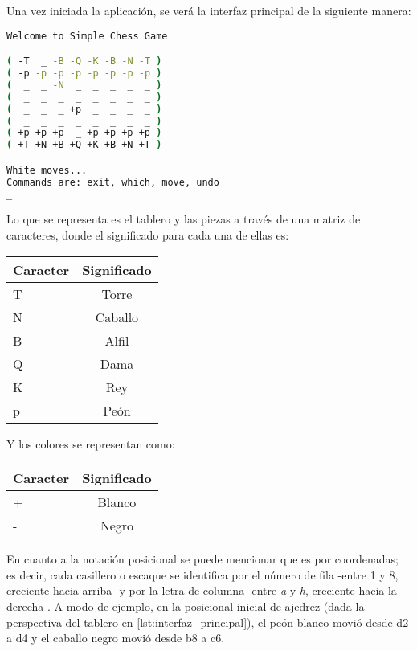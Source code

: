 \documentclass{llncs}
\begin{document}
Una vez iniciada la aplicación, se verá la interfaz principal de la siguiente manera:

\begin{lstlisting}[frame=single, language=bash, caption=Interfaz principal del programa, label={lst:interfaz_principal}]
Welcome to Simple Chess Game

( -T  _ -B -Q -K -B -N -T )
( -p -p -p -p -p -p -p -p )
(  _  _ -N  _  _  _  _  _ )
(  _  _  _  _  _  _  _  _ )
(  _  _  _ +p  _  _  _  _ )
(  _  _  _  _  _  _  _  _ )
( +p +p +p  _ +p +p +p +p )
( +T +N +B +Q +K +B +N +T )

White moves...
Commands are: exit, which, move, undo
_
\end{lstlisting}

Lo que se representa es el tablero y las piezas a través de una matriz de caracteres, donde el significado para cada una de ellas es:
\newline

\setlength{\tabcolsep}{20pt}
\begin{tabular}{ l | c }
  Caracter & Significado \\
  \hline
  T & Torre \\
  N & Caballo \\
  B & Alfil \\
  Q & Dama \\
  K & Rey \\
  p & Peón \\
\end{tabular}
\newline
\newline

Y los colores se representan como:
\newline

\setlength{\tabcolsep}{20pt}
\begin{tabular}{ l | c }
  Caracter & Significado \\
  \hline
  + & Blanco \\
  - & Negro \\
\end{tabular}
\newline
\newline

En cuanto a la notación posicional se puede mencionar que es por coordenadas; es decir, cada casillero o escaque se identifica por el número de fila -entre 1 y 8, creciente hacia arriba- y por la letra de columna -entre \textit{a}  y \textit{h}, creciente hacia la derecha-. A modo de ejemplo, en la posicional inicial de ajedrez (dada la perspectiva del tablero en \ref{lst:interfaz_principal}), el peón blanco movió desde d2 a d4 y el caballo negro movió desde b8 a c6.
\end{document}
